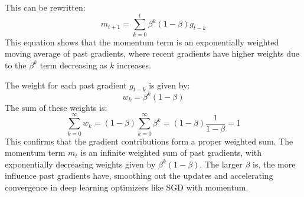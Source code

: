 \documentclass[10pt]{article}
\begin{document}
This can be rewritten:
\begin{equation}
    m_{t+1} = \sum_{k=0}^{t} \beta^k (1 - \beta) g_{t-k}
\end{equation}
This equation shows that the momentum term is an exponentially weighted moving average of past gradients, where recent gradients have higher weights due to the $\beta^k$ term decreasing as $k$ increases.

The weight for each past gradient $g_{t-k}$ is given by:
\begin{equation}
    w_k = \beta^k (1 - \beta)
\end{equation}
The sum of these weights is:
\begin{equation}
    \sum_{k=0}^{\infty} w_k = (1 - \beta) \sum_{k=0}^{\infty} \beta^k = (1 - \beta) \frac{1}{1 - \beta} = 1
\end{equation}
This confirms that the gradient contributions form a proper weighted sum.
The momentum term $m_t$ is an infinite weighted sum of past gradients, with exponentially decreasing weights given by $\beta^k (1 - \beta)$. The larger $\beta$ is, the more influence past gradients have, smoothing out the updates and accelerating convergence in deep learning optimizers like SGD with momentum.
\end{document}
